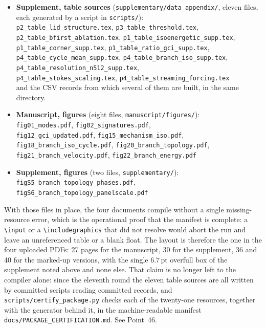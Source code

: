 \documentclass[11pt,a4paper]{article}
\begin{document}
\begin{itemize}
\item \textbf{Supplement, table sources} (\texttt{supplementary/data\_appendix/},
  eleven files, each generated by a script in \texttt{scripts/}):\\
  \small
  \texttt{p2\_table\_lid\_structure.tex}, \texttt{p3\_table\_threshold.tex},\\
  \texttt{p2\_table\_bfirst\_ablation.tex}, \texttt{p1\_table\_isoenergetic\_supp.tex},\\
  \texttt{p1\_table\_corner\_supp.tex}, \texttt{p1\_table\_ratio\_gci\_supp.tex},\\
  \texttt{p4\_table\_cycle\_mean\_supp.tex}, \texttt{p4\_table\_branch\_iso\_supp.tex},\\
  \texttt{p4\_table\_resolution\_n512\_supp.tex},\\
  \texttt{p4\_table\_stokes\_scaling.tex}, \texttt{p4\_table\_streaming\_forcing.tex}\\
  \normalsize
  and the CSV records from which several of them are built, in the same directory.
\item \textbf{Manuscript, figures} (eight files, \texttt{manuscript/figures/}):\\
  \small
  \texttt{fig01\_modes.pdf}, \texttt{fig02\_signatures.pdf},\\
  \texttt{fig12\_gci\_updated.pdf}, \texttt{fig15\_mechanism\_iso.pdf},\\
  \texttt{fig18\_branch\_iso\_cycle.pdf}, \texttt{fig20\_branch\_topology.pdf},\\
  \texttt{fig21\_branch\_velocity.pdf}, \texttt{fig22\_branch\_energy.pdf}\\
  \normalsize
\item \textbf{Supplement, figures} (two files, \texttt{supplementary/}):\\
  \small
  \texttt{figS5\_branch\_topology\_phases.pdf},\\
  \texttt{figS6\_branch\_topology\_panelscale.pdf}\\
  \normalsize
\end{itemize}
With those files in place, the four documents compile without a single missing-resource
error, which is the operational proof that the manifest is complete: a \texttt{\textbackslash input}
or a \texttt{\textbackslash includegraphics} that did not resolve would abort the run and leave an
unreferenced table or a blank float. The layout is therefore the one in the four uploaded
PDFs: 27 pages for the manuscript, 30 for the supplement, 36 and 40 for the marked-up
versions, with the single $6.7$\,pt overfull box of the supplement noted above and none else. That claim is no longer left to the compiler alone: since the eleventh round
the eleven table sources are all written by committed scripts reading committed records, and
\texttt{scripts/certify\_package.py} checks each of the twenty-one resources, together with
the generator behind it, in the machine-readable manifest
\texttt{docs/PACKAGE\_CERTIFICATION.md}. See Point~46.
\end{document}
